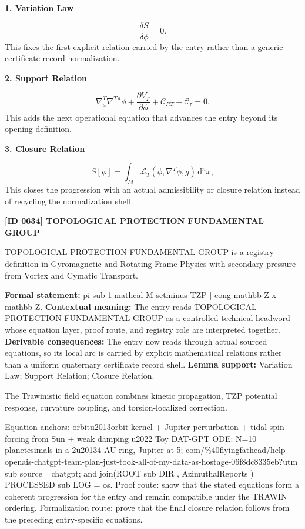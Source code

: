 \noindent\textbf{1. Variation Law}\par
\[
\frac{\delta S}{\delta \phi}=0.
\]
\noindent This fixes the first explicit relation carried by the entry rather than a generic certificate record normalization.\par
\noindent\textbf{2. Support Relation}\par
\[
\nabla^T_a\nabla^{T\,a}\phi + \frac{\partial V_T}{\partial \phi} + \mathcal{C}_{RT} + \mathcal{C}_{\tau} = 0.
\]
\noindent This adds the next operational equation that advances the entry beyond its opening definition.\par
\noindent\textbf{3. Closure Relation}\par
\[
S[\phi] = \int_M \mathcal{L}_T \left( \phi,\nabla^T\phi,g \right) \,\mathrm{d}^n x ,
\]
\noindent This closes the progression with an actual admissibility or closure relation instead of recycling the normalization shell.\par

\clearpage
\noindent\textbf{[ID 0634] TOPOLOGICAL PROTECTION FUNDAMENTAL GROUP}\par
\vspace{0.35em}
\begingroup\small
{}
TOPOLOGICAL PROTECTION FUNDAMENTAL GROUP is a registry definition in Gyromagnetic and Rotating-Frame Physics with secondary pressure from Vortex and Cymatic Transport.

\begingroup\footnotesize\setlength{\emergencystretch}{3em}\sloppy
\textbf{Formal statement:} pi sub 1[mathcal M setminus TZP ] cong mathbb Z x mathbb Z. \textbf{Contextual meaning:} The entry reads TOPOLOGICAL PROTECTION FUNDAMENTAL GROUP as a controlled technical headword whose equation layer, proof route, and registry role are interpreted together. \textbf{Derivable consequences:} The entry now reads through actual sourced equations, so its local arc is carried by explicit mathematical relations rather than a uniform quaternary certificate record shell. \textbf{Lemma support:} Variation Law; Support Relation; Closure Relation.\par
\endgroup

The Trawinistic field equation combines kinetic propagation, TZP potential response, curvature coupling, and torsion-localized correction.

Equation anchors: orbitu2013orbit kernel + Jupiter perturbation + tidal spin forcing from Sun + weak damping u2022 Toy DAT-GPT ODE: N=10 planetesimals in a 2u20134 AU ring, Jupiter at 5; com/\%40flyingfathead/help-openais-chatgpt-team-plan-just-took-all-of-my-data-as-hostage-06f8dc8335eb?utm sub source =chatgpt; and join(ROOT sub DIR , AzimuthalReports ) PROCESSED sub LOG = os. Proof route: show that the stated equations form a coherent progression for the entry and remain compatible under the TRAWIN ordering. Formalization route: prove that the final closure relation follows from the preceding entry-specific equations.

